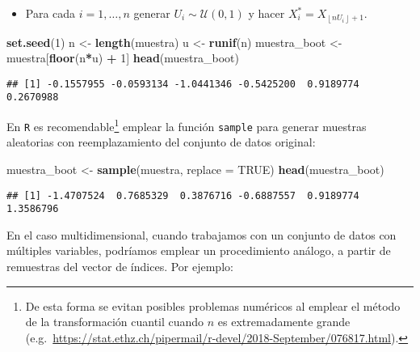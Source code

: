 \documentclass[
]{book}
\newenvironment{Shaded}{\begin{snugshade}}{\end{snugshade}}
\newcommand{\DataTypeTok}[1]{\textcolor[rgb]{0.13,0.29,0.53}{#1}}
\newcommand{\DecValTok}[1]{\textcolor[rgb]{0.00,0.00,0.81}{#1}}
\newcommand{\KeywordTok}[1]{\textcolor[rgb]{0.13,0.29,0.53}{\textbf{#1}}}
\newcommand{\NormalTok}[1]{#1}
\newcommand{\OperatorTok}[1]{\textcolor[rgb]{0.81,0.36,0.00}{\textbf{#1}}}
\newcommand{\OtherTok}[1]{\textcolor[rgb]{0.56,0.35,0.01}{#1}}
\newcommand{\StringTok}[1]{\textcolor[rgb]{0.31,0.60,0.02}{#1}}
\providecommand{\tightlist}{%
  \setlength{\itemsep}{0pt}\setlength{\parskip}{0pt}}
\theoremstyle{definition}
\theoremstyle{definition}
\theoremstyle{definition}
\theoremstyle{remark}
\begin{document}
\begin{itemize}
\tightlist
\item
  Para cada \(i=1,\ldots ,n\)
  generar \(U_i\sim \mathcal{U}\left( 0,1 \right)\) y
  hacer \(X_i^{\ast}=X_{\left\lfloor nU_i\right\rfloor +1}\).
\end{itemize}

\begin{Shaded}
\begin{Highlighting}[]
\KeywordTok{set.seed}\NormalTok{(}\DecValTok{1}\NormalTok{)}
\NormalTok{n <-}\StringTok{ }\KeywordTok{length}\NormalTok{(muestra)}
\NormalTok{u <-}\StringTok{ }\KeywordTok{runif}\NormalTok{(n)}
\NormalTok{muestra_boot <-}\StringTok{ }\NormalTok{muestra[}\KeywordTok{floor}\NormalTok{(n}\OperatorTok{*}\NormalTok{u) }\OperatorTok{+}\StringTok{ }\DecValTok{1}\NormalTok{]}
\KeywordTok{head}\NormalTok{(muestra_boot)}
\end{Highlighting}
\end{Shaded}

\begin{verbatim}
## [1] -0.1557955 -0.0593134 -1.0441346 -0.5425200  0.9189774  0.2670988
\end{verbatim}

En \texttt{R} es recomendable\footnote{De esta forma se evitan posibles problemas numéricos
  al emplear el método de la transformación cuantil cuando \(n\) es extremadamente grande
  (e.g.~\url{https://stat.ethz.ch/pipermail/r-devel/2018-September/076817.html}).}
emplear la función \texttt{sample} para generar muestras aleatorias con reemplazamiento
del conjunto de datos original:

\begin{Shaded}
\begin{Highlighting}[]
\NormalTok{muestra_boot <-}\StringTok{ }\KeywordTok{sample}\NormalTok{(muestra, }\DataTypeTok{replace =} \OtherTok{TRUE}\NormalTok{)}
\KeywordTok{head}\NormalTok{(muestra_boot)}
\end{Highlighting}
\end{Shaded}

\begin{verbatim}
## [1] -1.4707524  0.7685329  0.3876716 -0.6887557  0.9189774  1.3586796
\end{verbatim}

En el caso multidimensional, cuando trabajamos con un conjunto de datos
con múltiples variables,
podríamos emplear un procedimiento análogo, a partir de remuestras del
vector de índices. Por ejemplo:
\end{document}
